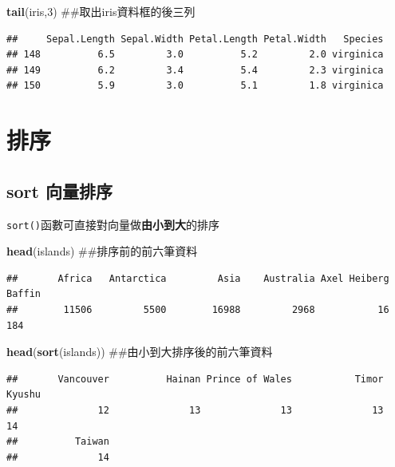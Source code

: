 \documentclass[]{book}
\newenvironment{Shaded}{\begin{snugshade}}{\end{snugshade}}
\newcommand{\KeywordTok}[1]{\textcolor[rgb]{0.13,0.29,0.53}{\textbf{{#1}}}}
\newcommand{\DecValTok}[1]{\textcolor[rgb]{0.00,0.00,0.81}{{#1}}}
\newcommand{\NormalTok}[1]{{#1}}
\theoremstyle{definition}
\theoremstyle{definition}
\theoremstyle{remark}
\begin{document}
\begin{Shaded}
\begin{Highlighting}[]
\KeywordTok{tail}\NormalTok{(iris,}\DecValTok{3}\NormalTok{) ##取出iris資料框的後三列}
\end{Highlighting}
\end{Shaded}

\begin{verbatim}
##     Sepal.Length Sepal.Width Petal.Length Petal.Width   Species
## 148          6.5         3.0          5.2         2.0 virginica
## 149          6.2         3.4          5.4         2.3 virginica
## 150          5.9         3.0          5.1         1.8 virginica
\end{verbatim}

\section{排序}

\subsection{sort 向量排序}\label{sort-}

\texttt{sort()}函數可直接對向量做\textbf{由小到大}的排序

\begin{Shaded}
\begin{Highlighting}[]
\KeywordTok{head}\NormalTok{(islands) ##排序前的前六筆資料}
\end{Highlighting}
\end{Shaded}

\begin{verbatim}
##       Africa   Antarctica         Asia    Australia Axel Heiberg       Baffin 
##        11506         5500        16988         2968           16          184
\end{verbatim}

\begin{Shaded}
\begin{Highlighting}[]
\KeywordTok{head}\NormalTok{(}\KeywordTok{sort}\NormalTok{(islands)) ##由小到大排序後的前六筆資料}
\end{Highlighting}
\end{Shaded}

\begin{verbatim}
##       Vancouver          Hainan Prince of Wales           Timor          Kyushu 
##              12              13              13              13              14 
##          Taiwan 
##              14
\end{verbatim}
\end{document}
